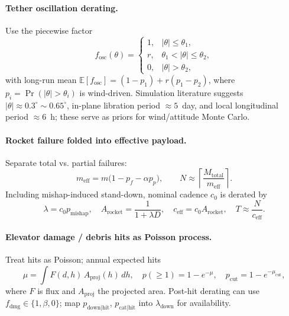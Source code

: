 ﻿\documentclass{mcmthesis}
\begin{document}
\paragraph{Tether oscillation derating.}
Use the piecewise factor
\begin{equation}
f_{\text{osc}}(\theta)=
\begin{cases}
1, & |\theta|\le \theta_1,\\
r, & \theta_1<|\theta|\le \theta_2,\\
0, & |\theta|>\theta_2,
\end{cases}
\end{equation}
with long-run mean $\mathbb{E}[f_{\text{osc}}]=(1-p_1)+r(p_1-p_2)$, where $p_i=\Pr(|\theta|>\theta_i)$ is wind-driven. Simulation literature suggests $|\theta|\approx0.3^{\circ}\sim0.65^{\circ}$, in-plane libration period $\approx5$~day, and local longitudinal period $\approx6$~h; these serve as priors for wind/attitude Monte Carlo.

\paragraph{Rocket failure folded into effective payload.}
Separate total vs. partial failures:
\begin{equation}
m_{\text{eff}}=m\bigl(1-p_f-\alpha p_p\bigr),\qquad
N\approx\left\lceil\frac{M_{\text{total}}}{m_{\text{eff}}}\right\rceil.
\end{equation}
Including mishap-induced stand-down, nominal cadence $c_0$ is derated by
\begin{equation}
\lambda=c_0p_{\text{mishap}},\quad
A_{\text{rocket}}=\frac{1}{1+\lambda D},\quad
c_{\text{eff}}=c_0A_{\text{rocket}},\quad
T\approx \frac{N}{c_{\text{eff}}}.
\end{equation}

\paragraph{Elevator damage / debris hits as Poisson process.}
Treat hits as Poisson; annual expected hits
\begin{equation}
\mu=\int F(d,h)\,A_{\text{proj}}(h)\,dh,\quad
p(\ge1)=1-e^{-\mu},\quad
p_{\text{cut}}=1-e^{-\mu_{\text{cut}}},
\end{equation}
where $F$ is flux and $A_{\text{proj}}$ the projected area. Post-hit derating can use $f_{\text{dmg}}\in\{1,\beta,0\}$; map $p_{\text{down}|\text{hit}}$, $p_{\text{cat}|\text{hit}}$ into $\lambda_{\text{down}}$ for availability.
\end{document}

